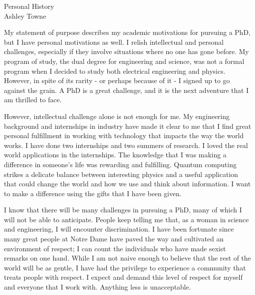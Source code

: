 \setlength{\oddsidemargin}{0in}
\setlength{\evensidemargin}{0in}
\setlength{\textwidth}{6.5in}
\setlength{\topmargin}{-.3in}
\setlength{\textheight}{9in}
\pagestyle{empty}



\begin{center}
{\Large Personal History} \\[.3in]
{\large Ashley Towne}
\end{center}

\vspace*{.5in}
{My statement of purpose describes my academic motivations for pursuing a
    PhD, but I have personal motivations as well. I relish intellectual and
    personal challenges, especially if they involve situations where no one has
    gone before. My program of study, the dual degree for engineering and
    science, was not a formal program when I decided to study both electrical
    engineering and physics. However, in spite of its rarity - or perhaps
    because of it - I signed up to go against the grain. A PhD is a great
    challenge, and it is the next adventure that I am thrilled to face.

    However, intellectual challenge alone is not enough for me. My engineering
    background and internships in industry have made it clear to me that I find
    great personal fulfillment in working with technology that impacts the way
    the world works. I have done two internships and two summers of research. I
    loved the real world applications in the internships. The knowledge that I
    was making a difference in someone's life was rewarding and fulfilling.
    Quantum computing strikes a delicate balance between interesting physics
    and a useful application that could change the world and how we use and
    think about information. I want to make a difference using the gifts that I
    have been given.

    I know that there will be many challenges in pursuing a PhD, many of which
    I will not be able to anticipate. People keep telling me that, as a woman
    in science and engineering, I will encounter discrimination. I have been
    fortunate since many great people at Notre Dame have paved the way and
    cultivated an environment of respect; I can count the individuals who have
    made sexist remarks on one hand. While I am not naive enough to believe
    that the rest of the world will be as gentle, I have had the privilege to
    experience a community that treats people with respect. I expect and demand
    this level of respect for myself and everyone that I work with. Anything
    less is unacceptable.

}
